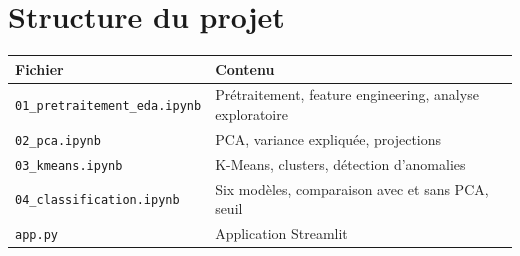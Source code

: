 \documentclass[12pt,a4paper]{article}
\begin{document}
\section{Structure du projet}
\begin{table}[H]
\centering
\small
\begin{tabularx}{\textwidth}{@{}l X@{}}
\toprule
\textbf{Fichier} & \textbf{Contenu} \\
\midrule
\texttt{01\_pretraitement\_eda.ipynb} & Prétraitement, feature engineering, analyse exploratoire \\
\texttt{02\_pca.ipynb} & PCA, variance expliquée, projections \\
\texttt{03\_kmeans.ipynb} & K-Means, clusters, détection d'anomalies \\
\texttt{04\_classification.ipynb} & Six modèles, comparaison avec et sans PCA, seuil \\
\texttt{app.py} & Application Streamlit \\
\bottomrule
\end{tabularx}
\end{table}
\end{document}

